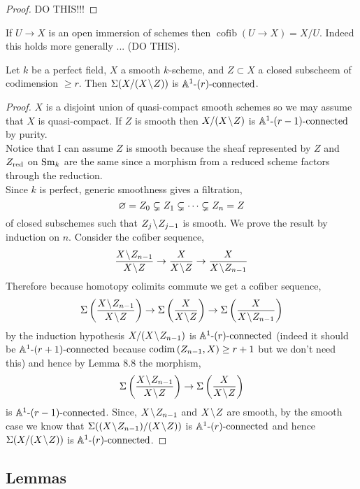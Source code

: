 \documentclass[12pt]{article}
\DeclareMathOperator{\cofib}{\mathrm{cofib}}
\begin{document}
\begin{proof}
DO THIS!!!
\end{proof}

\begin{rmk}
If $U \to X$ is an open immersion of schemes then $\cofib(U \to X) = X / U$. Indeed this holds more generally ... (DO THIS).
\end{rmk}

\begin{lemma}[8.9]
Let $k$ be a perfect field, $X$ a smooth $k$-scheme, and $Z \subset X$ a closed subscheem of codimension $\ge r$. Then $\Sigma(X/(X \! \setminus \! Z))$ is $\mathbb{A}^1\text{-}(r)\text{-connected}$. 
\end{lemma}

\begin{proof}
$X$ is a disjoint union of quasi-compact smooth schemes so we may assume that $X$ is quasi-compact. If $Z$ is smooth then $X / (X \! \setminus \! Z)$ is $\mathbb{A}^1\text{-}(r-1)\text{-connected}$ by purity.
\bigskip\\
Notice that I can assume $Z$ is smooth because the sheaf represented by $Z$ and $Z_{\mathrm{red}}$ on $\mathrm{Sm}_k$ are the same since a morphism from a reduced scheme factors through the reduction.
\bigskip\\
Since $k$ is perfect, generic smoothness gives a filtration,
\[ \varnothing = Z_0 \subsetneq Z_1 \subsetneq \cdots \subsetneq Z_n = Z \]
of closed subschemes such that $Z_j \! \setminus \! Z_{j-1}$ is smooth. We prove the result by induction on $n$. Consider the cofiber sequence,
\[ \frac{X \sm Z_{n-1}}{X \sm Z} \to \frac{X}{X \sm Z} \to \frac{X}{X \sm Z_{n-1}} \]
Therefore because homotopy colimits commute we get a cofiber sequence,
\[ \Sigma \left( \frac{X \sm Z_{n-1}}{X \sm Z} \right) \to \Sigma \left( \frac{X}{X \sm Z} \right) \to \Sigma \left( \frac{X}{X \sm Z_{n-1}} \right) \]
by the induction hypothesis $X / (X \! \setminus \! Z_{n-1})$ is $\mathbb{A}^1\text{-}(r)\text{-connected}$ (indeed it should be $\mathbb{A}^1\text{-}(r+1)\text{-connected}$ because $\mathrm{codim}\left( Z_{n-1}, X \right) \ge r + 1$ but we don't need this) and hence by Lemma 8.8 the morphism,
\[ \Sigma \left( \frac{X \! \setminus \! Z_{n-1}}{X \! \setminus \! Z} \right) \to \Sigma \left( \frac{X}{X \! \setminus \! Z} \right)  \]
is $\mathbb{A}^1\text{-}(r-1)\text{-connected}$. Since, $X \! \setminus \! Z_{n-1}$ and $X \! \setminus \! Z$ are smooth, by the smooth case we know that $\Sigma ((X \! \setminus \! Z_{n-1})/(X \! \setminus \! Z))$ is $\mathbb{A}^1\text{-}(r)\text{-connected}$ and hence $\Sigma( X / (X \! \setminus \! Z))$ is $\mathbb{A}^1\text{-}(r)\text{-connected}$.
\end{proof}

\subsection{Lemmas}
\end{document}
